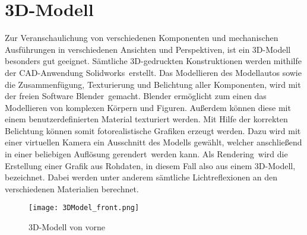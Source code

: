 \section{3D-Modell}
\label{sec:3Dmodel}
Zur Veranschaulichung von verschiedenen Komponenten und mechanischen Ausführungen in verschiedenen Ansichten und Perspektiven, ist ein 3D-Modell besonders gut geeignet. Sämtliche 3D-gedruckten Konstruktionen werden mithilfe der \ac{CAD}-Anwendung \glqq Solidworks\grqq\ erstellt. Das Modellieren des Modellautos sowie die Zusammenfügung, Texturierung und Belichtung aller Komponenten, wird mit der freien Software \glqq Blender\grqq\ gemacht. Blender ermöglicht zum einen das Modellieren von komplexen Körpern und Figuren. Außerdem können diese mit einem benutzerdefinierten Material texturiert werden. Mit Hilfe der korrekten Belichtung können somit fotorealistische Grafiken erzeugt werden. Dazu wird mit einer virtuellen Kamera ein Ausschnitt des Modells gewählt, welcher anschließend in einer beliebigen Auflösung \glqq gerendert\grqq\ werden kann. Als \glqq Rendering\grqq\ wird die Erstellung einer Grafik aus Rohdaten, in diesem Fall also aus einem 3D-Modell, bezeichnet. Dabei werden unter anderem sämtliche Lichtreflexionen an den verschiedenen Materialien berechnet.
\begin{figure}[h]
\centering
\texttt{[image: 3DModel\_front.png]}
\caption{\ac{3D}-Modell von vorne}
\label{fig:3DFront}
\end{figure}
